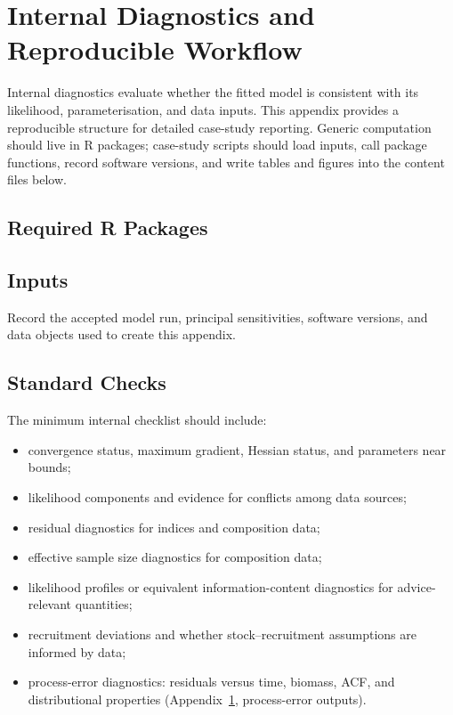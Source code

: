 \section{Internal Diagnostics and Reproducible Workflow}
\label{app:internal}

Internal diagnostics evaluate whether the fitted model is consistent with its likelihood,
parameterisation, and data inputs. This appendix provides a reproducible structure for
detailed case-study reporting. Generic computation should live in R packages; case-study
scripts should load inputs, call package functions, record software versions, and write
tables and figures into the content files below.

\subsection{Required R Packages}



\subsection{Inputs}

Record the accepted model run, principal sensitivities, software versions, and data
objects used to create this appendix.



\subsection{Standard Checks}

The minimum internal checklist should include:

\begin{itemize}
  \item convergence status, maximum gradient, Hessian status, and parameters near bounds;
  \item likelihood components and evidence for conflicts among data sources;
  \item residual diagnostics for indices and composition data;
  \item effective sample size diagnostics for composition data;
  \item likelihood profiles or equivalent information-content diagnostics for advice-relevant quantities;
  \item recruitment deviations and whether stock--recruitment assumptions are informed by data;
  \item process-error diagnostics: residuals versus time, biomass, ACF, and distributional properties (Appendix~\ref{app:internal}, process-error outputs).
\end{itemize}

